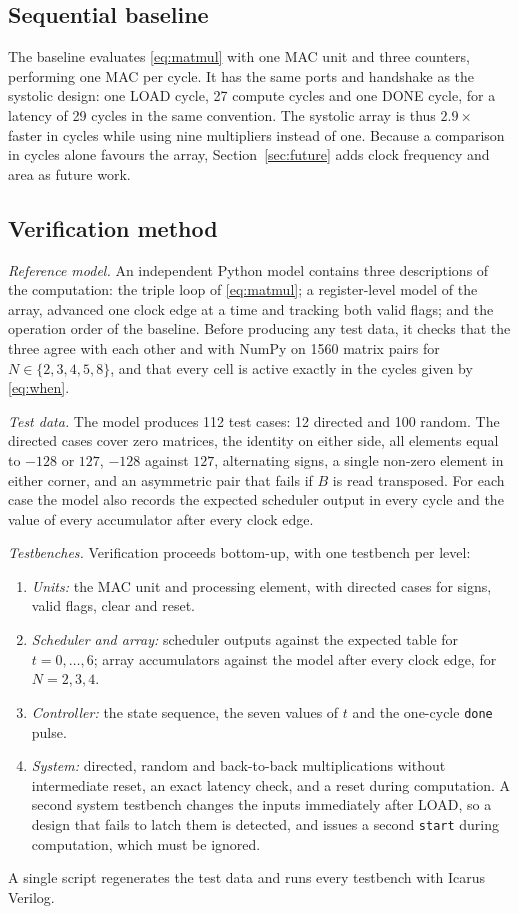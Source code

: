 \documentclass[conference]{IEEEtran}
\newcommand{\code}[1]{\texttt{#1}}
\begin{document}
\subsection{Sequential baseline}
The baseline evaluates \eqref{eq:matmul} with one MAC unit and three counters, performing one MAC per cycle. It has the same ports and handshake as the systolic design: one LOAD cycle, 27 compute cycles and one DONE cycle, for a latency of 29 cycles in the same convention. The systolic array is thus $2.9\times$ faster in cycles while using nine multipliers instead of one. Because a comparison in cycles alone favours the array, Section~\ref{sec:future} adds clock frequency and area as future work.

\subsection{Verification method}
\label{sec:verif}
\emph{Reference model.} An independent Python model contains three descriptions of the computation: the triple loop of \eqref{eq:matmul}; a register-level model of the array, advanced one clock edge at a time and tracking both valid flags; and the operation order of the baseline. Before producing any test data, it checks that the three agree with each other and with NumPy on 1560 matrix pairs for $N \in \{2, 3, 4, 5, 8\}$, and that every cell is active exactly in the cycles given by \eqref{eq:when}.

\emph{Test data.} The model produces 112 test cases: 12 directed and 100 random. The directed cases cover zero matrices, the identity on either side, all elements equal to $-128$ or $127$, $-128$ against $127$, alternating signs, a single non-zero element in either corner, and an asymmetric pair that fails if $B$ is read transposed. For each case the model also records the expected scheduler output in every cycle and the value of every accumulator after every clock edge.

\emph{Testbenches.} Verification proceeds bottom-up, with one testbench per level:
\begin{enumerate}
\item \emph{Units:} the MAC unit and processing element, with directed cases for signs, valid flags, clear and reset.
\item \emph{Scheduler and array:} scheduler outputs against the expected table for $t = 0, \ldots, 6$; array accumulators against the model after every clock edge, for $N = 2, 3, 4$.
\item \emph{Controller:} the state sequence, the seven values of $t$ and the one-cycle \code{done} pulse.
\item \emph{System:} directed, random and back-to-back multiplications without intermediate reset, an exact latency check, and a reset during computation. A second system testbench changes the inputs immediately after LOAD, so a design that fails to latch them is detected, and issues a second \code{start} during computation, which must be ignored.
\end{enumerate}
A single script regenerates the test data and runs every testbench with Icarus Verilog.
\end{document}
